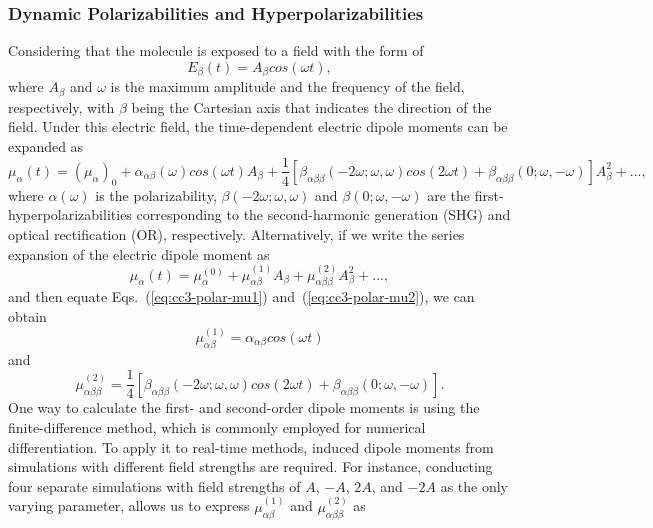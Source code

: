 \subsubsection{Dynamic Polarizabilities and Hyperpolarizabilities} \label{theory-cc3-22}
Considering that the molecule is exposed to a field with the form of
\begin{equation}
E_{\beta}(t) = A_{\beta}cos(\omega t),
\label{eq:cc3-polar-field}
\end{equation}
where $A_{\beta}$ and $\omega$ is the maximum amplitude and the frequency of the field, respectively, with $\beta$ being the Cartesian axis that indicates the direction of the field. Under this electric field, the time-dependent electric dipole moments can be expanded as
\begin{equation}
\mu_{\alpha}(t) = (\mu_{\alpha})_{0} + \alpha_{\alpha\beta}(\omega)cos(\omega t)A_{\beta} 
+ \frac{1}{4}[ \beta_{\alpha\beta\beta}(-2\omega;\omega,\omega)cos(2\omega t) + \beta_{\alpha\beta\beta}(0;\omega,-\omega)]A_{\beta}^{2} + ...,
\label{eq:cc3-polar-mu1}
\end{equation}
where $\alpha(\omega)$ is the polarizability, $\beta(-2\omega;\omega,\omega)$ and $\beta(0;\omega,-\omega)$ are the first-hyperpolarizabilities corresponding to the second-harmonic generation (SHG) and optical rectification (OR), respectively. Alternatively, if we write the series expansion of the electric dipole moment as 
\begin{equation}
\mu_{\alpha}(t) = \mu_{\alpha}^{(0)} + \mu_{\alpha\beta}^{(1)} A_{\beta} + \mu_{\alpha\beta\beta}^{(2)}A_{\beta}^{2} + ...,
\label{eq:cc3-polar-mu2}
\end{equation}
and then equate Eqs.~(\ref{eq:cc3-polar-mu1}) and~(\ref{eq:cc3-polar-mu2}), we can obtain
\begin{equation}
\mu_{\alpha\beta}^{(1)} = \alpha_{\alpha\beta}cos(\omega t)
\label{eq:cc3-polar-alpha}
\end{equation}
and
\begin{equation}
\mu_{\alpha\beta\beta}^{(2)} = \frac{1}{4}[ \beta_{\alpha\beta\beta}(-2\omega;\omega,\omega)cos(2\omega t) + \beta_{\alpha\beta\beta}(0;\omega,-\omega)].
\label{eq:cc3-polar-beta}
\end{equation}
One way to calculate the first- and second-order dipole moments is using the finite-difference method, which is commonly employed for numerical differentiation. To apply it to real-time methods, induced dipole moments from simulations with different field strengths are required. For instance, conducting four separate simulations with field strengths of $A$, $-A$, $2A$, and $-2A$ as the only varying parameter, allows us to express $\mu_{\alpha \beta}^{(1)}$ and $\mu_{\alpha \beta\beta}^{(2)}$ as

